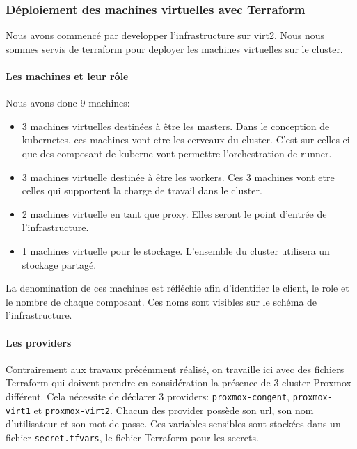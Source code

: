 \documentclass[12pt]{article}
\begin{document}
\subsubsection{Déploiement des machines virtuelles avec Terraform}
Nous avons commencé par developper l'infrastructure sur virt2. Nous nous sommes servis de terraform pour deployer les machines virtuelles sur le cluster. 

\paragraph{Les machines et leur rôle}
Nous avons donc 9 machines:

\begin{itemize}
    \item 3 machines virtuelles destinées à être les masters. 
    Dans le conception de kubernetes, ces machines vont etre les cerveaux du cluster.
    C'est sur celles-ci que des composant de kuberne vont permettre l'orchestration de runner.
    \item 3 machines virtuelle destinée à être les workers. 
    Ces 3 machines vont etre celles qui supportent la charge de travail dans le cluster.
    \item 2 machines virtuelle en tant que proxy. 
    Elles seront le point d'entrée de l'infrastructure. 
    \item 1 machines virtuelle pour le stockage. 
    L'ensemble du cluster utilisera un stockage partagé.
\end{itemize}

La denomination de ces machines est réfléchie afin d'identifier le client, le role et le nombre de chaque composant. 
Ces noms sont visibles sur le schéma de l'infrastructure.

\paragraph{Les providers}
Contrairement aux travaux précémment réalisé, on travaille ici avec des fichiers Terraform qui doivent prendre en considération la présence de 3 cluster Proxmox différent.
Cela nécessite de déclarer 3 providers: \verb|proxmox-congent|, \verb|proxmox-virt1| et \verb|proxmox-virt2|.
Chacun des provider possède son url, son nom d'utilisateur et son mot de passe.
Ces variables sensibles sont stockées dans un fichier \verb|secret.tfvars|, le fichier Terraform pour les secrets.
\end{document}
